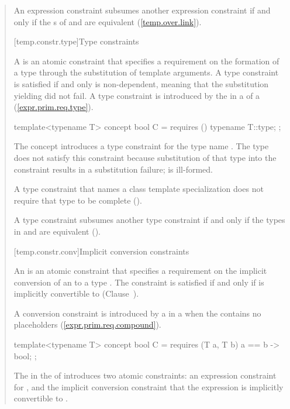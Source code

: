 \begin{quote}
\pnum
An expression constraint  subsumes another expression constraint 
 if and only if the s of 
and  are equivalent (\ref{temp.over.link}). 


[temp.constr.type]{Type constraints}

\pnum
A  is an atomic constraint that specifies a requirement 
on the formation of a type  through the substitution of template 
arguments.
% 
A type constraint is satisfied if and only  is non-dependent, meaning 
that the substitution yielding  did not fail.
% 
\enternote
A type constraint is introduced by the  in a
 of a 
(\ref{expr.prim.req.type}).
\exitnote
% 
\enterexample
\begin{codeblock}
template<typename T> concept bool C = requires () { typename T::type; };
\end{codeblock}
The concept  introduces a type constraint for the 
type name .
% 
The type  does not satisfy this constraint
because substitution of that type into the constraint results in a
substitution failure;  is ill-formed.
\exitexample

\pnum
A type constraint that names a class template specialization 
does not require that type to be complete 
().

\pnum
A type constraint  subsumes another type
constraint  if and only if the types in 
and  are equivalent 
().


[temp.constr.conv]{Implicit conversion constraints}

\pnum
An  is an atomic constraint that 
specifies a requirement on the implicit conversion of an 
 to a type . 
% 
The constraint is satisfied if and only if  is implicitly convertible 
to  (Clause~).

\enternote
A conversion constraint is introduced by a  
in a  when the 
 contains no placeholders 
(\ref{expr.prim.req.compound}).
\exitnote

\enterexample
\begin{codeblock}
template<typename T> concept bool C = 
  requires (T a, T b) {
    { a == b } -> bool;
  };
\end{codeblock}
The  in the
 of  introduces two atomic 
constraints: an expression constraint for , and the implicit 
conversion constraint that the expression  is implicitly 
convertible to .
\exitexample


\end{quote}
